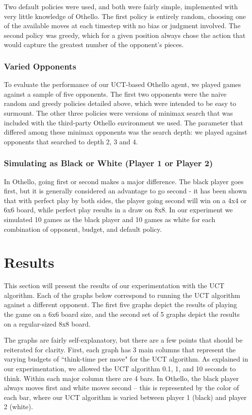\documentclass[12pt,letterpaper]{article}
\begin{document}
Two default policies were used, and both were fairly simple, implemented with very little knowledge of Othello. The first policy is entirely random, choosing one of the available moves at each timestep with no bias or judgment involved. The second policy was greedy, which for a given position always chose the action that would capture the greatest number of the opponent's pieces.

\subsubsection{Varied Opponents}
To evaluate the performance of our UCT-based Othello agent, we played games against a sample of five opponents. The first two opponents were the naive random and greedy policies detailed above, which were intended to be easy to surmount. The other three policies were versions of minimax search that was included with the third-party Othello environment we used. The parameter that differed among these minimax opponents was the search depth: we played against opponents that searched to depth 2, 3 and 4.

\subsubsection{Simulating as Black or White (Player 1 or Player 2)}
In Othello, going first or second makes a major difference. The black player goes first, but it is generally considered an advantage to go second - it has been shown that with perfect play by both sides, the player going second will win on a 4x4 or 6x6 board, while perfect play results in a draw on 8x8. In our experiment we simulated 10 games as the black player and 10 games as white for each combination of opponent, budget, and default policy.

\section{Results}
\label{results}

This section will present the results of our experimentation with the UCT algorithm. Each of the graphs below correspond to running the UCT algorithm against a different opponent.  The first five graphs depict the results of playing the game on a 6x6 board size, and the second set of 5 graphs depict the results on a regular-sized 8x8 board.

The graphs are fairly self-explanatory, but there are a few points that should be reiterated for clarity.  First, each graph has 3 main columns that represent the varying budgets of ``think-time per move" for the UCT algorithm.  As explained in our experimentation, we allowed the UCT algorithm 0.1, 1, and 10 seconds to think. Within each major column there are 4 bars.  In Othello, the black player always moves first and white moves second -- this is represented by the color of each bar, where our UCT algorithm is varied between player 1 (black) and player 2 (white). 
\end{document}
